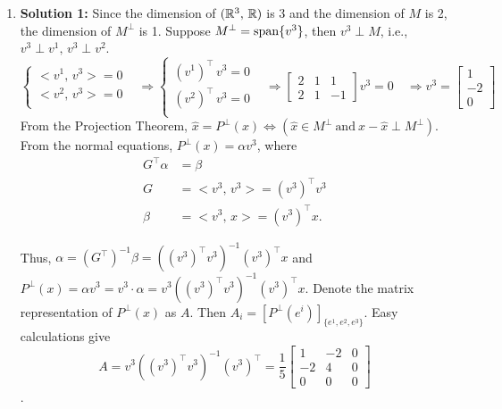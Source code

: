 \documentclass[letterpaper]{article}
\begin{document}
\begin{enumerate}
\setlength{\itemsep}{.15in}
\renewcommand{\labelenumi}{(\alph{enumi})}
\item[] \textbf{Solution 1:} Since the dimension of $(\mathbb R^{3},\,\mathbb R)$ is 3 and the dimension of $M$ is 2, the dimension of $M^\perp$ is 1. Suppose $M^\perp = \textrm{span} \{ v^{3} \}$, then $v^{3}\perp M$, i.e., $v^{3}\perp v^{1},\,v^{3}\perp v^{2}$.
    \begin{equation*}
      \left\{
        \begin{array}{ll}
          <v^{1},\,v^{3}>=0&\\
          <v^{2},\,v^{3}>=0&\\
        \end{array}
      \right.\Rightarrow
      \left\{
        \begin{array}{ll}
          (v^{1})^\top\,v^{3}=0&\\
          (v^{2})^\top\,v^{3}=0&\\
        \end{array}
      \right.\Rightarrow
      \begin{bmatrix}2 & 1 & 1\\2 & 1 & -1\end{bmatrix}v^{3}=0
      \quad\Rightarrow v^{3}=\begin{bmatrix}1 \\-2\\ 0\end{bmatrix}
    \end{equation*}
    From the Projection Theorem, $\hat{x}=P^\perp(x) \Leftrightarrow (\hat{x}\in M^\perp~\text{and}~ x-\hat{x}\perp M^\perp)$.
    From the normal equations, $P^\perp(x) = \alpha v^{3}$, where
    \begin{align*}
    G^\top \alpha &=\beta \\
    G&=<v^{3},\,v^{3}>=(v^{3})^\top v^{3} \\
    \beta &=<v^{3},\,x>=(v^{3})^\top x.
    \end{align*}

    Thus, $\alpha =(G^\top )^{-1}\beta=\left((v^{3})^\top v^{3}\right)^{-1}(v^{3})^\top x$ and $P^\perp(x) = \alpha v^{3} = v^{3} \cdot \alpha=v^{3}\left((v^{3})^\top v^{3}\right)^{-1}(v^{3})^\top x$.
    Denote the matrix representation of $P^\perp(x)$ as $A$. Then $A_i = [P^\perp(e^i)]_{\{e^1, e^2, e^3\}}.$ Easy calculations give
    $$A=v^{3}\left((v^{3})^\top v^{3}\right)^{-1}(v^{3})^\top=\dfrac{1}{5}\begin{bmatrix}1 &-2& 0\\ -2 & 4 & 0\\ 0 & 0 & 0\end{bmatrix} $$.


\end{enumerate}
\end{document}
